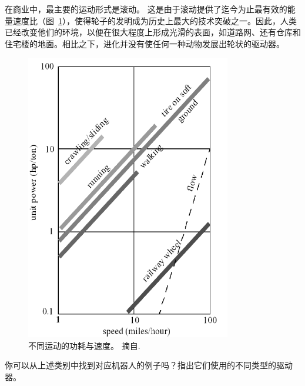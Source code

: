 在商业中，最主要的运动形式是滚动。 这是由于滚动提供了迄今为止最有效的能量速度比（图~\ref{fig:todd}），使得轮子的发明成为历史上最大的技术突破之一。因此，人类已经改变他们的环境，以便在很大程度上形成光滑的表面，如道路网、还有仓库和住宅楼的地面。相比之下，进化并没有使任何一种动物发展出轮状的驱动器。

\begin{figure}
	\centering
		\includegraphics[width=0.8\textwidth]{figs/todd85.png}
	\caption{不同运动的功耗与速度。 摘自\protect{}.}
	\label{fig:todd}
\end{figure}


\begin{framed}
你可以从上述类别中找到对应机器人的例子吗？指出它们使用的不同类型的驱动器。
\end{framed}

